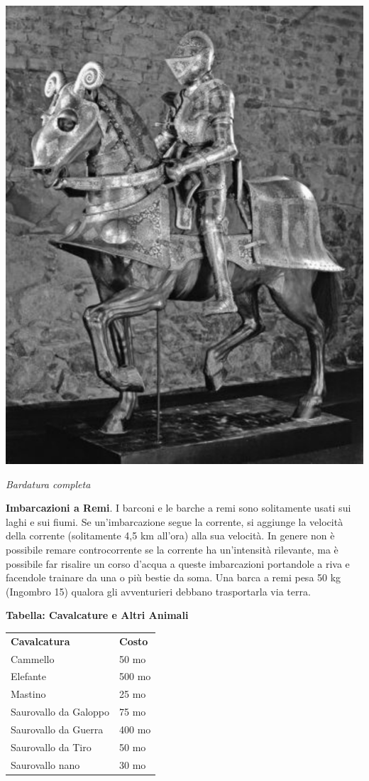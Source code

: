 \begin{multicols}{2}
\begin{center}
	\includegraphics[width=0.8\linewidth]{immagini/bardatura.png}

	\emph{Bardatura completa}
\end{center}

\textbf{Imbarcazioni a Remi}\hypertarget{Barca a remi}{}\label{Barca a remi}. I barconi e le barche a remi sono solitamente usati sui laghi e sui fiumi. Se un'imbarcazione segue la corrente, si aggiunge la velocità della corrente (solitamente 4,5 km all'ora) alla sua velocità. In genere non è possibile remare controcorrente se la corrente ha un'intensità rilevante, ma è possibile far risalire un corso d'acqua a queste imbarcazioni portandole a riva e facendole trainare da una o più bestie da soma. Una barca a remi pesa 50 kg (Ingombro 15) qualora gli avventurieri debbano trasportarla via terra.

\medskip

\textbf{Tabella: Cavalcature e Altri Animali}\label{costicavalcature}

\begin{tabularx}{0.48\textwidth}{ll}
\toprule
\textbf{Cavalcatura}&\textbf{Costo}\\
Cammello&50 mo\\
Elefante&500 mo\\
Mastino&25 mo\\
Saurovallo da Galoppo&75 mo\\
Saurovallo da Guerra&400 mo\\
Saurovallo da Tiro&50 mo\\
Saurovallo nano&30 mo
\end{tabularx}


\end{multicols}
